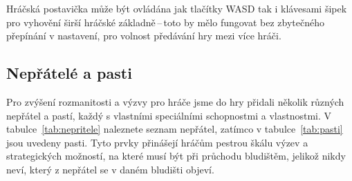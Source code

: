 Hráčská postavička může být ovládána jak tlačítky WASD tak i klávesami šipek pro vyhovění širší hráčské základně\,--\,toto by mělo fungovat bez zbytečného přepínání v nastavení, pro volnost předávání hry mezi více hráči.

\subsection*{Nepřátelé a pasti}
Pro zvýšení rozmanitosti a výzvy pro hráče jsme do hry přidali několik různých nepřátel a pastí, každý s vlastními speciálními schopnostmi a vlastnostmi. V tabulce~\ref{tab:nepritele} naleznete seznam nepřátel, zatímco v tabulce~\ref{tab:pasti} jsou uvedeny pasti. Tyto prvky přinášejí hráčům pestrou škálu výzev a strategických možností, na které musí být při průchodu bludištěm, jelikož nikdy neví, který z nepřátel se v daném bludišti objeví.


